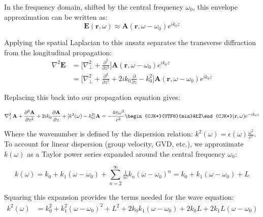\documentclass[11pt,a4paper]{article}
\newcommand{\kii}{\text{\begin{CJK*}{UTF8}{min}力\end{CJK*}}}
\begin{document}
In the frequency domain, shifted by the central frequency $\omega_0$, this envelope approximation can be written as:
\begin{equation*}
\textbf{E}(\textbf{r},\omega) \approx\textbf{A}(\textbf{r},\omega-\omega_0) e^{ik_0z} 
\end{equation*}

Applying the spatial Laplacian to this ansatz separates the transverse diffraction from the longitudinal propagation:
\begin{equation*}
\begin{split}
\nabla^2 \mathbf{E} &= \bigg[\nabla_\perp^2 + \frac{\partial^2}{\partial z^2}\bigg]\mathbf{A}(\mathbf{r},\omega-\omega_0)e^{ik_0z} \\
&= \bigg[\nabla_\perp^2 + \frac{\partial^2}{\partial z^2}+ 2ik_0\frac{\partial}{\partial z}-k_0^2\bigg] \mathbf{A}(\mathbf{r},\omega-\omega_0)e^{ik_0z}
\end{split}
\end{equation*}

Replacing this back into our propagation equation gives: 

\begin{equation*}
\nabla_\perp^2\mathbf{A}+ \frac{\partial^2 \mathbf{A}}{\partial z^2} + 2ik_0 \frac{\partial\mathbf{A}}{\partial z} + [k^2(\omega) - k_0^2]\mathbf{A}= -\frac{4\pi \omega^2}{c^2} \kii(\mathbf{r},\omega) e^{-ik_0z}
\end{equation*}

Where the wavenumber is defined by the dispersion relation: $k^2(\omega) = \epsilon(\omega)\frac{\omega^2}{c^2}$.
\\
To account for linear dispersion (group velocity, GVD, etc.), we approximate $k(\omega)$ as a Taylor power series expanded around the central frequency $\omega_0$: 

\begin{equation*}
k(\omega) = k_0 + k_1(\omega-\omega_0) + \sum_{n=2}^{\infty}\tfrac{1}{n!}k_n(\omega-\omega_0)^n = k_0 + k_1(\omega-\omega_0) + L
\end{equation*}

Squaring this expansion provides the terms needed for the wave equation:
\begin{equation*}
\begin{split}
k^2(\omega) &= k_0^2 + k_1^2(\omega - \omega_0)^2 + L^2 + 2k_0k_1(\omega-\omega_0) + 2k_0L + 2k_1L(\omega-\omega_0)
\end{split}
\end{equation*}
\end{document}
